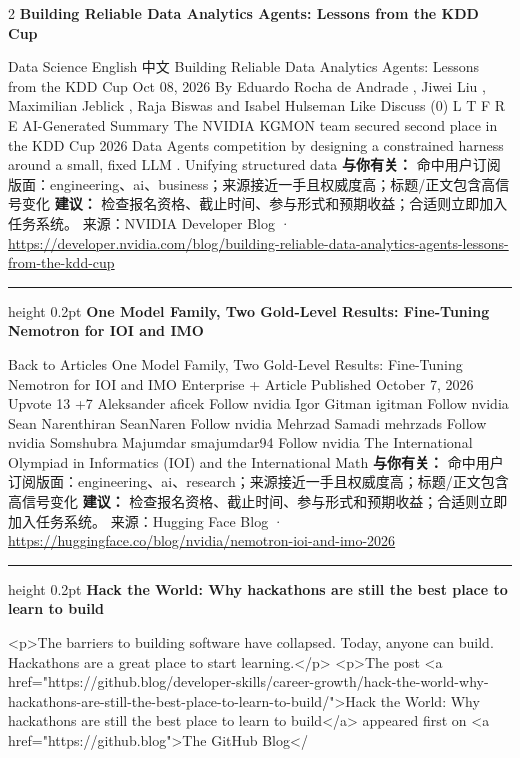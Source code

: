 \documentclass[10.5pt]{ctexart}
\begin{document}
\begin{multicols}{2}
{\large\bfseries Building Reliable Data Analytics Agents: Lessons from the KDD Cup}\par
Data Science English 中文 Building Reliable Data Analytics Agents: Lessons from the KDD Cup Oct 08, 2026 By Eduardo Rocha de Andrade , Jiwei Liu , Maximilian Jeblick , Raja Biswas and Isabel Hulseman Like Discuss (0) L T F R E AI-Generated Summary The NVIDIA KGMON team secured second place in the KDD Cup 2026 Data Agents competition by designing a constrained harness around a small, fixed LLM . Unifying structured data
\textbf{与你有关：} 命中用户订阅版面：engineering、ai、business；来源接近一手且权威度高；标题/正文包含高信号变化
\textbf{建议：} 检查报名资格、截止时间、参与形式和预期收益；合适则立即加入任务系统。
{\footnotesize\color{ormuted} 来源：NVIDIA Developer Blog · \url{https://developer.nvidia.com/blog/building-reliable-data-analytics-agents-lessons-from-the-kdd-cup}}
\vspace{2mm}
\hrule height 0.2pt
\vspace{2mm}
{\large\bfseries One Model Family, Two Gold-Level Results: Fine-Tuning Nemotron for IOI and IMO}\par
Back to Articles One Model Family, Two Gold-Level Results: Fine-Tuning Nemotron for IOI and IMO Enterprise + Article Published October 7, 2026 Upvote 13 +7 Aleksander aficek Follow nvidia Igor Gitman igitman Follow nvidia Sean Narenthiran SeanNaren Follow nvidia Mehrzad Samadi mehrzads Follow nvidia Somshubra Majumdar smajumdar94 Follow nvidia The International Olympiad in Informatics (IOI) and the International Math
\textbf{与你有关：} 命中用户订阅版面：engineering、ai、research；来源接近一手且权威度高；标题/正文包含高信号变化
\textbf{建议：} 检查报名资格、截止时间、参与形式和预期收益；合适则立即加入任务系统。
{\footnotesize\color{ormuted} 来源：Hugging Face Blog · \url{https://huggingface.co/blog/nvidia/nemotron-ioi-and-imo-2026}}
\vspace{2mm}
\hrule height 0.2pt
\vspace{2mm}
{\large\bfseries Hack the World: Why hackathons are still the best place to learn to build}\par
<p>The barriers to building software have collapsed. Today, anyone can build. Hackathons are a great place to start learning.</p> <p>The post <a href="https://github.blog/developer-skills/career-growth/hack-the-world-why-hackathons-are-still-the-best-place-to-learn-to-build/">Hack the World: Why hackathons are still the best place to learn to build</a> appeared first on <a href="https://github.blog">The GitHub Blog</

\end{multicols}
\end{document}
